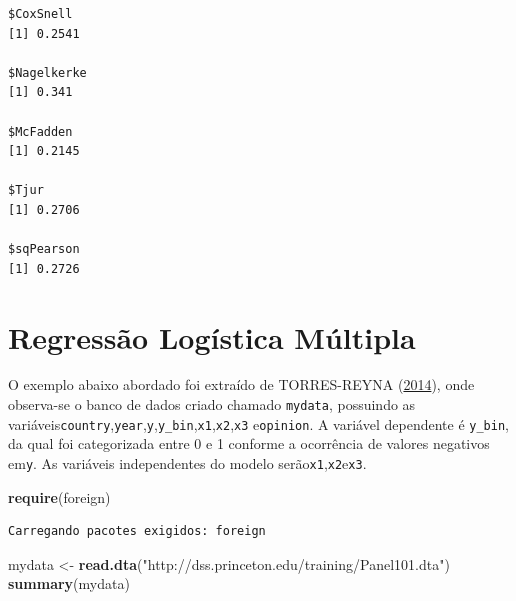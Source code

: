 \documentclass[12pt,brazil,oneside]{book}
\newenvironment{Shaded}{\begin{snugshade}}{\end{snugshade}}
\newcommand{\KeywordTok}[1]{\textcolor[rgb]{0.13,0.29,0.53}{\textbf{#1}}}
\newcommand{\NormalTok}[1]{#1}
\newcommand{\StringTok}[1]{\textcolor[rgb]{0.31,0.60,0.02}{#1}}
\begin{document}
\begin{verbatim}
$CoxSnell
[1] 0.2541

$Nagelkerke
[1] 0.341

$McFadden
[1] 0.2145

$Tjur
[1] 0.2706

$sqPearson
[1] 0.2726
\end{verbatim}

\hypertarget{regressao-logistica-multipla}{%
\section{Regressão Logística
Múltipla}\label{regressao-logistica-multipla}}

O exemplo abaixo abordado foi extraído de TORRES-REYNA
(\protect\hyperlink{ref-Torres-Reyna2014}{2014}), onde observa-se o
banco de dados criado chamado \texttt{mydata}, possuindo as
variáveis\texttt{country},\texttt{year},\texttt{y},\texttt{y\_bin},\texttt{x1},\texttt{x2},\texttt{x3}
e\texttt{opinion}. A variável dependente é \texttt{y\_bin}, da qual foi
categorizada entre 0 e 1 conforme a ocorrência de valores negativos
em\texttt{y}. As variáveis independentes do modelo
serão\texttt{x1},\texttt{x2}e\texttt{x3}.

\begin{Shaded}
\begin{Highlighting}[]
\KeywordTok{require}\NormalTok{(foreign)}
\end{Highlighting}
\end{Shaded}

\begin{verbatim}
Carregando pacotes exigidos: foreign
\end{verbatim}

\begin{Shaded}
\begin{Highlighting}[]
\NormalTok{mydata <-}\StringTok{ }\KeywordTok{read.dta}\NormalTok{(}\StringTok{"http://dss.princeton.edu/training/Panel101.dta"}\NormalTok{) }
\KeywordTok{summary}\NormalTok{(mydata)}
\end{Highlighting}
\end{Shaded}
\end{document}
